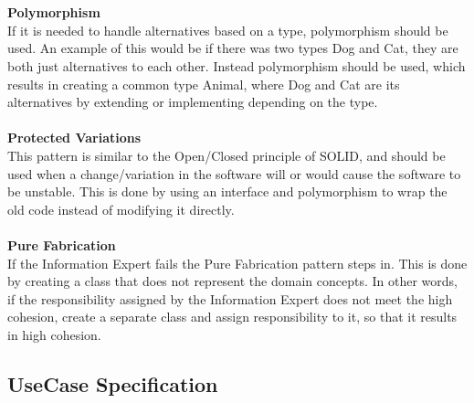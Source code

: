 \\
\\
\textbf{Polymorphism}
\\
If it is needed to handle alternatives based on a type, polymorphism should be used. An example of this would be if there was two types Dog and Cat, they are both just alternatives to each other. Instead polymorphism should be used, which results in creating a common type Animal, where Dog and Cat are its alternatives by extending or implementing depending on the type.
\\
\\
\textbf{Protected Variations}
\\
This pattern is similar to the Open/Closed principle of SOLID, and should be used when
a change/variation in the software will or would cause the software to be unstable. This is done by using an interface and polymorphism to wrap the old code instead of modifying it directly.
\\
\\
\textbf{Pure Fabrication}
\\
If the Information Expert fails the Pure Fabrication pattern steps in. This is done by creating a class that does not represent the domain concepts. In other words, if the responsibility assigned by the Information Expert does not meet the high cohesion, create a separate class and assign responsibility to it, so that it results in high cohesion.

\newpage
\subsection {UseCase Specification}
\label{appendix:useCase_specification}
\newpage

